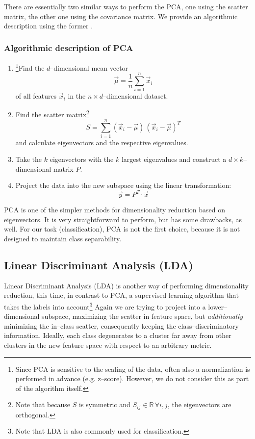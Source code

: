 There are essentially two similar ways to perform the PCA, one using the scatter matrix, the other one using the covariance matrix. We provide an algorithmic description using the former \citep{duda2001}.

\subsubsection{Algorithmic description of PCA}
\label{par:pca-algorithm}
\begin{enumerate}
\item \footnote{Since PCA is sensitive to the scaling of the data, often also a normalization is performed in advance (e.g. z--score). However, we do not consider this as part of the algorithm itself.}Find the $d$--dimensional mean vector
\begin{equation}
\label{eq:mean-vector}
\vec \mu = \frac{1}{n} \sum_{i = 1}^n \vec x_i
\end{equation}
of all features $\vec x_i$ in the $n \times d$--dimensional dataset.
\item Find the scatter matrix\footnote{Note that because $S$ is symmetric and $S_{ij} \in \mathbb{R} \, \forall i,j$, the eigenvectors are orthogonal.}
\begin{equation}
S = \sum_{i=1}^n (\vec x_i - \vec \mu) \, (\vec x_i - \vec \mu)^T
\end{equation}
and calculate eigenvectors and the respective eigenvalues.
\item Take the $k$ eigenvectors with the $k$ largest eigenvalues and construct a $d \times k$--dimensional matrix $P$.
\item Project the data into the new subspace using the linear transformation:
\begin{equation}
\vec y = P^T \cdot \vec x
\end{equation}
\end{enumerate}

PCA is one of the simpler methods for dimensionality reduction based on eigenvectors. It is very straightforward to perform, but has some drawbacks, as well. For our task (classification), PCA is not the first choice, because it is not designed to maintain class separability.

\subsection{Linear Discriminant Analysis (LDA)}
\label{sec:theory:lda}

Linear Discriminant Analysis (LDA) is another way of performing dimensionality reduction, this time, in contrast to PCA, a supervised learning algorithm that takes the labels into account\footnote{Note that LDA is also commonly used for classification.} Again we are trying to project into a lower--dimensional subspace, maximizing the scatter in feature space, but \emph{additionally} minimizing the in--class scatter, consequently keeping the class--discriminatory information. Ideally, each class degenerates to a cluster far away from other clusters in the new feature space with respect to an arbitrary metric.

